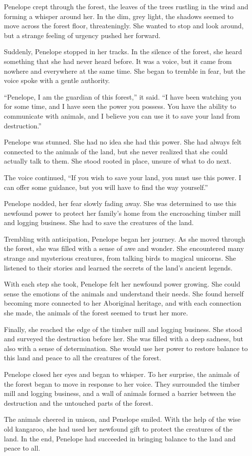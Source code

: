 

Penelope crept through the forest, the leaves of the trees rustling in the wind and forming a whisper around her. In the dim, grey light, the shadows seemed to move across the forest floor, threateningly. She wanted to stop and look around, but a strange feeling of urgency pushed her forward.

Suddenly, Penelope stopped in her tracks. In the silence of the forest, she heard something that she had never heard before. It was a voice, but it came from nowhere and everywhere at the same time. She began to tremble in fear, but the voice spoke with a gentle authority.

“Penelope, I am the guardian of this forest,” it said. “I have been watching you for some time, and I have seen the power you possess. You have the ability to communicate with animals, and I believe you can use it to save your land from destruction.”

Penelope was stunned. She had no idea she had this power. She had always felt connected to the animals of the land, but she never realized that she could actually talk to them. She stood rooted in place, unsure of what to do next.

The voice continued, “If you wish to save your land, you must use this power. I can offer some guidance, but you will have to find the way yourself.”

Penelope nodded, her fear slowly fading away. She was determined to use this newfound power to protect her family's home from the encroaching timber mill and logging business. She had to save the creatures of the land.

Trembling with anticipation, Penelope began her journey. As she moved through the forest, she was filled with a sense of awe and wonder. She encountered many strange and mysterious creatures, from talking birds to magical unicorns. She listened to their stories and learned the secrets of the land’s ancient legends.

With each step she took, Penelope felt her newfound power growing. She could sense the emotions of the animals and understand their needs. She found herself becoming more connected to her Aboriginal heritage, and with each connection she made, the animals of the forest seemed to trust her more.

Finally, she reached the edge of the timber mill and logging business. She stood and surveyed the destruction before her. She was filled with a deep sadness, but also with a sense of determination. She would use her power to restore balance to this land and peace to all the creatures of the forest.

Penelope closed her eyes and began to whisper. To her surprise, the animals of the forest began to move in response to her voice. They surrounded the timber mill and logging business, and a wall of animals formed a barrier between the destruction and the untouched parts of the forest.

The animals cheered in unison, and Penelope smiled. With the help of the wise old kangaroo, she had used her newfound gift to protect the creatures of the land. In the end, Penelope had succeeded in bringing balance to the land and peace to all.